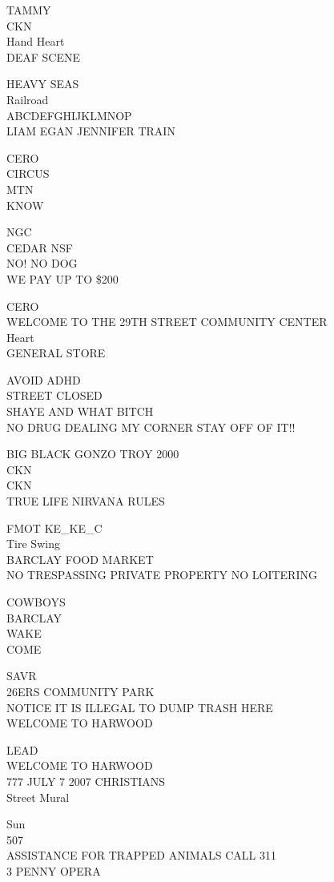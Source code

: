 \documentclass[10pt,letterpaper]{article}
\begin{document}
TAMMY\\
CKN\\
Hand Heart\\
DEAF SCENE

HEAVY SEAS\\
Railroad\\
ABCDEFGHIJKLMNOP\\
LIAM EGAN JENNIFER TRAIN

CERO\\
CIRCUS\\
MTN\\
KNOW

NGC\\
CEDAR NSF\\
NO! NO DOG\\
WE PAY UP TO \$200

CERO\\
WELCOME TO THE 29TH STREET COMMUNITY CENTER\\
Heart\\
GENERAL STORE

AVOID ADHD\\
STREET CLOSED\\
SHAYE AND WHAT BITCH\\
NO DRUG DEALING MY CORNER STAY OFF OF IT!!

BIG BLACK GONZO TROY 2000\\
CKN\\
CKN\\
TRUE LIFE NIRVANA RULES

FMOT KE\_KE\_C\\
Tire Swing\\
BARCLAY FOOD MARKET\\
NO TRESPASSING PRIVATE PROPERTY NO LOITERING

COWBOYS\\
BARCLAY\\
WAKE\\
COME

SAVR\\
26ERS COMMUNITY PARK\\
NOTICE IT IS ILLEGAL TO DUMP TRASH HERE\\
WELCOME TO HARWOOD

LEAD\\
WELCOME TO HARWOOD\\
777 JULY 7 2007 CHRISTIANS\\
Street Mural

Sun\\
507\\
ASSISTANCE FOR TRAPPED ANIMALS CALL 311\\
3 PENNY OPERA
\end{document}
